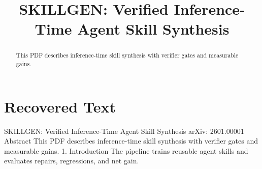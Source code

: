 \title{SKILLGEN: Verified Inference-Time Agent Skill Synthesis}

\maketitle

\begin{abstract}
This PDF describes inference-time skill synthesis with verifier gates and measurable gains.
\end{abstract}

\section{Recovered Text}
SKILLGEN: Verified Inference-Time Agent Skill Synthesis
arXiv: 2601.00001
Abstract
This PDF describes inference-time skill synthesis with verifier gates and measurable gains.
1. Introduction
The pipeline trains reusable agent skills and evaluates repairs, regressions, and net gain.

